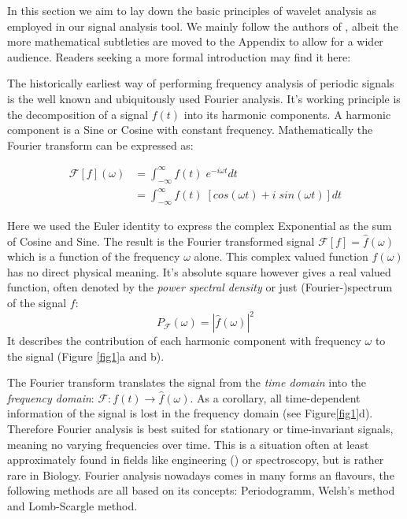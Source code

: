 In this section we aim to lay down the basic principles of wavelet analysis as employed in our signal analysis tool. We mainly follow the authors of \cite{Torrence1998}, albeit the more mathematical subtleties are moved to the Appendix to allow for a wider audience. Readers seeking a more formal introduction may find it here: \cite{Daubechies1992, Mallat1999} 

The historically earliest way of performing frequency analysis of periodic signals is the well known and ubiquitously used Fourier analysis. It's working principle is the decomposition of a signal $f(t)$ into its harmonic components. A harmonic component is a Sine or Cosine with constant frequency. Mathematically the Fourier transform can be expressed as:

\begin{align}
  \label{Ftrafo}
  \mathcal{F}[f](\omega) &= \int_{-\infty}^{\infty} f(t)\;e^{- i \omega t} dt \\
  &= \int_{-\infty}^{\infty} f(t)\; \left[cos(\omega t) + i\;sin(\omega t) \right] dt
\end{align}

Here we used the Euler identity to express the complex Exponential as the sum of Cosine and Sine. The result is the Fourier transformed signal $\mathcal{F}[f] = \widehat{f}(\omega)$ which is a function of the frequency $\omega$ alone. 
This complex valued function $\widehat{f}(\omega)$ has no direct physical meaning. It's absolute square however gives a real valued function, often denoted by the \textit{power spectral density} or just (Fourier-)spectrum of the signal $f$:
\begin{equation}
  P_\mathcal{F}(\omega) = |\widehat{f}(\omega)|^2
\end{equation}
It describes the contribution of each harmonic component with frequency $\omega$ to the signal (Figure \ref{fig1}a and b). 

The Fourier transform translates the signal from the \textit{time domain} into the \textit{frequency domain}: $\mathcal{F} : f(t) \rightarrow \widehat{f}(\omega)$. As a corollary, all time-dependent information of the signal is lost in the frequency domain (see Figure\ref {fig1}d). Therefore Fourier analysis is best suited for stationary or time-invariant signals, meaning no varying frequencies over time. This is a situation often at least approximately found in fields like engineering (\cite{Smith1997}) or spectroscopy, but is rather rare in Biology. Fourier analysis nowadays comes in many forms an flavours, the following methods are all based on its concepts: Periodogramm, Welsh's method and Lomb-Scargle method.

